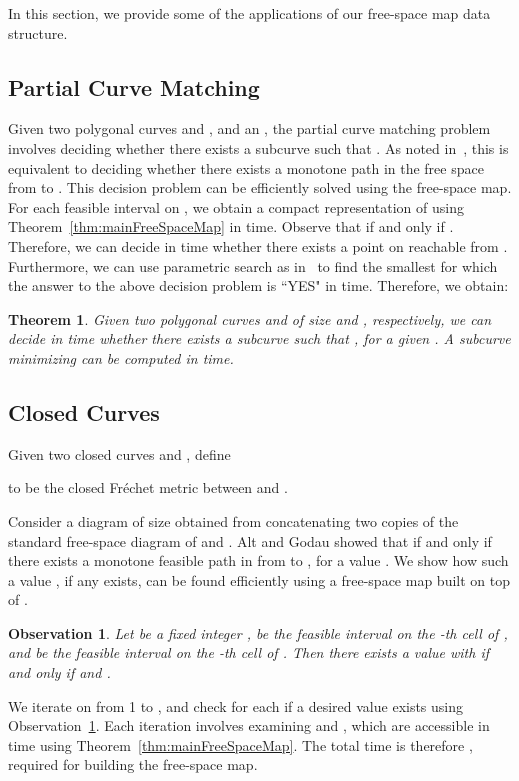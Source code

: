 \documentclass[12pt]{dalthesis}
\newtheorem{theorem}{Theorem}
\newtheorem{obs}{Observation}
\newcommand{\Frechet}{Fr\'echet }
\newcommand{\fs}{free-space }
\begin{document}
In this section, we provide some of the applications of our \fs map data structure.

\subsection{Partial Curve Matching\ }
Given two polygonal curves  and , and an ,
the partial curve matching problem involves
deciding whether there exists a subcurve  such that .
As noted in~\cite{AltG95}, 
this is equivalent to deciding whether 
there exists a monotone path in the free space from  to . 
This decision problem can be efficiently solved using the \fs map.
For each feasible interval  on ,
we obtain a compact representation of  using 
Theorem~\ref{thm:mainFreeSpaceMap} in  time.
Observe that  if and only if 
.
Therefore, we can decide in  time 
whether there exists a point on  reachable from .
Furthermore, we can use parametric search as in~\cite{AltG95}
to find the smallest  for which the answer to the above decision problem is ``YES" in 
 time.
Therefore, we obtain:

\begin{theorem} \label{thm:partial}
	Given two polygonal curves  and  of size  and , respectively,
	we can decide in  time whether there exists a subcurve  
	such that , for a given .
	A subcurve  minimizing  can be computed in  time.
\end{theorem}


\subsection{Closed Curves}
Given two closed curves  and ,
define

to be the closed \Frechet metric
between  and . 


Consider a diagram  of size 
obtained from concatenating two copies of the standard \fs diagram of  and .
Alt and Godau showed that  if and only if
there exists a monotone feasible path in  from  to ,
for a value .
We show how such a value , if any exists,
can be found efficiently using a \fs map built on top of .

\begin{obs} \label{obs:t}
	Let  be a fixed integer ,
	 be the feasible interval on the -th cell of , and 
	 be the feasible interval on the -th cell of .
	Then there exists a value  with  if and only if 
	 and .
\end{obs}


We  iterate on  from 1 to ,
and check for each  if a desired value  exists using Observation~\ref{obs:t}. 
Each iteration involves examining  and ,
which are accessible in  time using Theorem~\ref{thm:mainFreeSpaceMap}.
The total time is therefore , required for building the \fs map.
\end{document}
